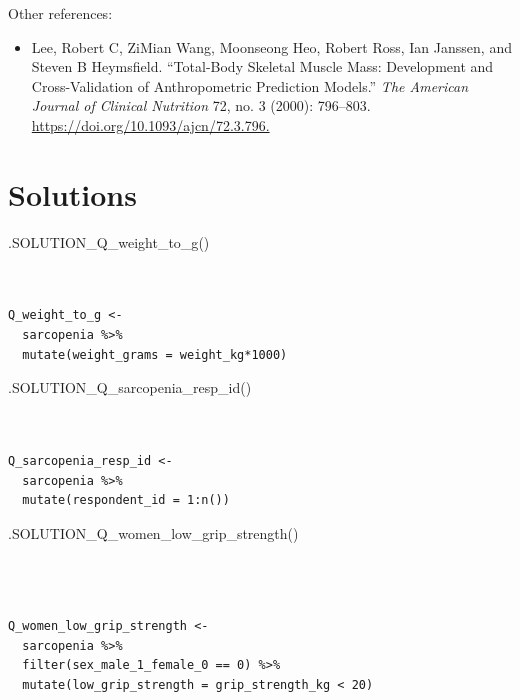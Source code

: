\documentclass[
  letterpaper,
  DIV=11,
  numbers=noendperiod]{scrreprt}
\newenvironment{Shaded}{\begin{snugshade}}{\end{snugshade}}
\newcommand{\FunctionTok}[1]{\textcolor[rgb]{0.28,0.35,0.67}{#1}}
\newcommand{\NormalTok}[1]{\textcolor[rgb]{0.00,0.23,0.31}{#1}}
\providecommand{\tightlist}{%
  \setlength{\itemsep}{0pt}\setlength{\parskip}{0pt}}\usepackage{longtable,booktabs,array}
\begin{document}
Other references:

\begin{itemize}
\tightlist
\item
  Lee, Robert C, ZiMian Wang, Moonseong Heo, Robert Ross, Ian Janssen,
  and Steven B Heymsfield. ``Total-Body Skeletal Muscle Mass:
  Development and Cross-Validation of Anthropometric Prediction
  Models.'' \emph{The American Journal of Clinical Nutrition} 72, no. 3
  (2000): 796--803. \url{https://doi.org/10.1093/ajcn/72.3.796.}
\end{itemize}

\hypertarget{solutions-3}{%
\section{Solutions}\label{solutions-3}}

\begin{Shaded}
\begin{Highlighting}[]
\FunctionTok{.SOLUTION\_Q\_weight\_to\_g}\NormalTok{()}
\end{Highlighting}
\end{Shaded}

\begin{verbatim}


Q_weight_to_g <- 
  sarcopenia %>% 
  mutate(weight_grams = weight_kg*1000)
\end{verbatim}

\begin{Shaded}
\begin{Highlighting}[]
\FunctionTok{.SOLUTION\_Q\_sarcopenia\_resp\_id}\NormalTok{()}
\end{Highlighting}
\end{Shaded}

\begin{verbatim}


Q_sarcopenia_resp_id <-
  sarcopenia %>%
  mutate(respondent_id = 1:n())
\end{verbatim}

\begin{Shaded}
\begin{Highlighting}[]
\FunctionTok{.SOLUTION\_Q\_women\_low\_grip\_strength}\NormalTok{()}
\end{Highlighting}
\end{Shaded}

\begin{verbatim}



Q_women_low_grip_strength <-
  sarcopenia %>%
  filter(sex_male_1_female_0 == 0) %>%
  mutate(low_grip_strength = grip_strength_kg < 20)
  
\end{verbatim}
\end{document}
